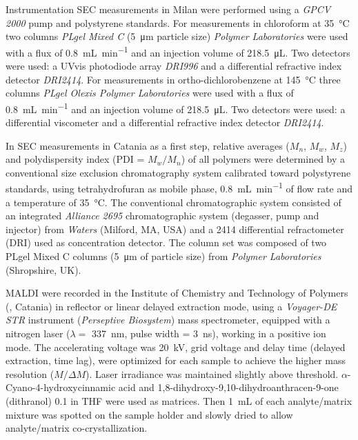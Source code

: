 \begin{section}{Instrumentation}
\Acrfull{SEC} measurements in Milan were performed using a \emph{GPCV 2000} pump and polystyrene standards. For measurements in chloroform at \SI{35}{\celsius} two columns \emph{PLgel Mixed C} (\SI{5}{\um} particle size) \emph{Polymer Laboratories} were used with a flux of \SI{0.8}{\mL\per\minute} and an injection volume of \SI{218.5}{\uL}. Two detectors were used: a \gls{UVvis} photo\-diode array \emph{DRI996} and a differential refractive index detector \emph{DRI2414}. 
For measurements in ortho-di\-chloro\-benzene at \SI{145}{\celsius} three columns \emph{PLgel Olexis Polymer Laboratories} were used with a flux of \SI{0.8}{\mL\per\minute} and an injection volume of \SI{218.5}{\uL}. Two detectors were used: a differential viscometer and a differential refractive index detector \emph{DRI2414}.

In \gls{SEC} measurements in Catania as a first step, relative averages ($M_n$, $M_w$, $M_z$) and polydispersity index (PDI = $M_w/M_n$) of all polymers were determined by a conventional size exclusion chromatography system calibrated toward polystyrene standards, using tetrahydrofuran as mobile phase, \SI{0.8}{\mL\per\minute} of flow rate and a temperature of \SI{35}{\celsius}. The conventional chromatographic system consisted of an integrated \emph{Alliance 2695} chromatographic system (de\-gasser, pump and injector) from \emph{Waters} (Milford, MA, USA) and a 2414 differential refractometer (DRI) used as concentration detector. The column set was composed of two PLgel Mixed C columns (\SI{5}{\um} of particle size) from \emph{Polymer Laboratories} (Shropshire, UK).

\Acrfull{MALDI} were recorded in the Institute of Chemistry and Technology of Polymers (, Catania) in reflector or linear delayed extraction mode, using a \emph{Voyager-DE STR} instrument (\emph{Perseptive Biosystem}) mass spectrometer, equipped with a nitrogen laser ($\lambda =$ \SI{337}{\nm}, pulse width = \SI{3}{\ns}), working in a positive ion mode. The accelerating voltage was \SI{20}{\kV}, grid voltage and delay time (delayed extraction, time lag), were optimized for each sample to achieve the higher mass resolution ($M / \Delta M$). Laser irradiance was maintained slightly above threshold. $\alpha$-Cyano-4-hydr\-oxy\-cinnamic acid and 1,8-di\-hydr\-oxy-9,10-di\-hydro\-anthracen-9-one (di\-thranol) \SI{0.1}{\Molar} in \gls{THF} were used as matrices. Then \SI{1}{\mL} of each analyte/matrix mixture was spotted on the  sample holder and slowly dried to allow analyte/matrix co-crystallization. 


\end{section}
